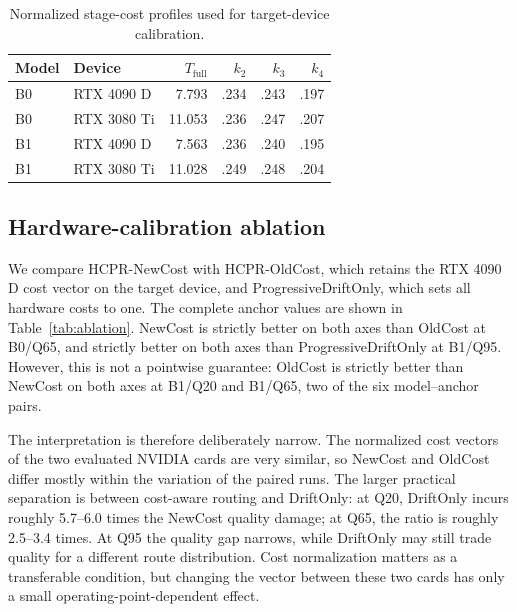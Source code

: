 \documentclass[runningheads]{llncs}
\begin{document}
\begin{table}[t]
\centering
\caption{Normalized stage-cost profiles used for target-device calibration.}
\label{tab:cost}
\small
\setlength{\tabcolsep}{4pt}
\begin{tabular}{llrrrr}
\toprule
Model & Device & $T_{\mathrm{full}}$ & $k_2$ & $k_3$ & $k_4$ \\
\midrule
B0 & RTX 4090 D & 7.793 & .234 & .243 & .197 \\
B0 & RTX 3080 Ti & 11.053 & .236 & .247 & .207 \\
B1 & RTX 4090 D & 7.563 & .236 & .240 & .195 \\
B1 & RTX 3080 Ti & 11.028 & .249 & .248 & .204 \\
\bottomrule
\end{tabular}
\end{table}

\subsection{Hardware-calibration ablation}
We compare HCPR-NewCost with HCPR-OldCost, which retains the RTX 4090 D cost vector on the target device, and ProgressiveDriftOnly, which sets all hardware costs to one. The complete anchor values are shown in Table~\ref{tab:ablation}. NewCost is strictly better on both axes than OldCost at B0/Q65, and strictly better on both axes than ProgressiveDriftOnly at B1/Q95. However, this is not a pointwise guarantee: OldCost is strictly better than NewCost on both axes at B1/Q20 and B1/Q65, two of the six model--anchor pairs.

The interpretation is therefore deliberately narrow. The normalized cost vectors of the two evaluated NVIDIA cards are very similar, so NewCost and OldCost differ mostly within the variation of the paired runs. The larger practical separation is between cost-aware routing and DriftOnly: at Q20, DriftOnly incurs roughly 5.7--6.0 times the NewCost quality damage; at Q65, the ratio is roughly 2.5--3.4 times. At Q95 the quality gap narrows, while DriftOnly may still trade quality for a different route distribution. Cost normalization matters as a transferable condition, but changing the vector between these two cards has only a small operating-point-dependent effect.
\end{document}

